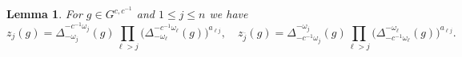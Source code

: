 \documentclass[12pt]{amsart}
\newcommand{\ol}[1]{\overline{#1}}
\newtheorem{lemma}[theorem]{Lemma}
\theoremstyle{remark}
\numberwithin{equation}{section}
\numberwithin{figure}{section}
\begin{document}


\begin{lemma}\label{lemma:coefficients_identities}
For $g \in G^{c,c^{-1}}$ and $1 \leq j \leq n$ we have
  \begin{equation*}
z_j(g) =\Delta_{-\omega_j}^{-c^{-1}\omega_j}(g)
    \prod_{\ell>j}\Big(\Delta_{-\omega_\ell}^{-c^{-1}\omega_\ell}(g)\Big)^{a_{\ell j}},\quad
z_{\ol{j}}(g) = \Delta_{-c^{-1}\omega_j}^{-\omega_j}(g)
    \prod_{\ell>j}\Big(\Delta_{-c^{-1}\omega_\ell}^{-\omega_\ell}(g)\Big)^{a_{\ell j}}.
  \end{equation*}
\end{lemma}
\end{document}
